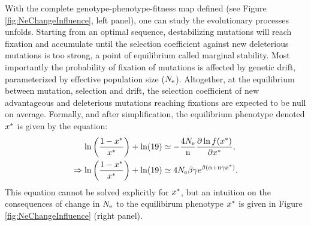 \documentclass{article}
\begin{document}
With the complete genotype-phenotype-fitness map defined (see Figure \ref{fig:NeChangeInfluence}, left panel), one can study the evolutionary processes unfolds.
Starting from an optimal sequence, destabilizing mutations will reach fixation and accumulate until the selection coefficient against new deleterious mutations is too strong, a point of equilibrium called marginal stability.
Most importantly the probability of fixation of mutations is affected by genetic drift, parameterized by effective population size ($N_{\mathrm{e}}$).
Altogether, at the equilibrium between mutation, selection and drift, the selection coefficient of new advantageous and deleterious mutations reaching fixations are expected to be null on average.
Formally, and after simplification, the equilibrium phenotype denoted $x^{*}$ is given by the equation:
\begin{align}
\ln \left( \frac{1 - x^{*}}{x^{*}} \right) + \ln (19) & \simeq - \frac{4N_{\mathrm{e}}}{\text{n}} \frac{ \partial \ln f(x^{*}) }{\partial {x^{*}}}, \\
\Rightarrow \ln \left( \frac{1 - x^{*}}{x^{*}} \right) + \ln (19)  & \simeq 4N_{\mathrm{e}} \beta \gamma e^{\beta (\alpha + \text{n} \gamma x^{*})}. \label{eq:equilibrium}
\end{align}
This equation cannot be solved explicitly for $x^{*}$, but an intuition on the consequences of change in $N_{\mathrm{e}}$ to the equilibirum phenotype $x^{*}$ is given in Figure \ref{fig:NeChangeInfluence} (right panel). \\
\end{document}
